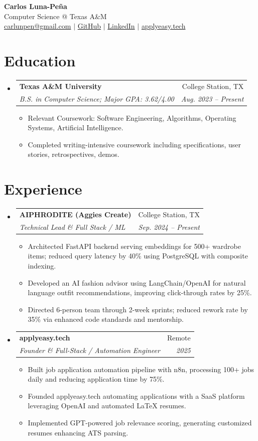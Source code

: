 \documentclass[letterpaper,11pt]{article}
\makeatletter
\newcommand{\resumeItem}[1]{\item\small{{#1 \vspace{-2pt}}}}
\newcommand{\resumeSubheading}[4]{
  \vspace{-2pt}\item
    \begin{tabular*}{0.97\textwidth}[t]{l@{\extracolsep{\fill}}r}
      \textbf{#1} & #2 \\
      \textit{\small#3} & \textit{\small #4} \\
    \end{tabular*}\vspace{-7pt}
}
\newcommand{\resumeSubHeadingListStart}{\begin{itemize}[leftmargin=0.15in, label={}]}
\newcommand{\resumeSubHeadingListEnd}{\end{itemize}}
\newcommand{\resumeItemListStart}{\begin{itemize}}
\newcommand{\resumeItemListEnd}{\end{itemize}\vspace{-5pt}}
\makeatother
\begin{document}
\begin{center}
    \textbf{\LARGE Carlos Luna-Peña}\\
    \small Computer Science @ Texas A\&M\\
    \href{mailto:carlunpen@gmail.com}{carlunpen@gmail.com} $|$ \href{https://github.com/clmoon2}{GitHub} $|$ \href{https://linkedin.com/in/carlos-luna}{LinkedIn} $|$ \href{https://applyeasy.tech}{applyeasy.tech}\\
\end{center}

\section{Education}
\resumeSubHeadingListStart
\resumeSubheading
{Texas A\&M University}{College Station, TX}
{B.S. in Computer Science; Major GPA: 3.62/4.00}{Aug. 2023 -- Present}
\resumeItemListStart
\resumeItem{Relevant Coursework: Software Engineering, Algorithms, Operating Systems, Artificial Intelligence.}
\resumeItem{Completed writing-intensive coursework including specifications, user stories, retrospectives, demos.}
\resumeItemListEnd
\resumeSubHeadingListEnd

\section{Experience}
\resumeSubHeadingListStart

\resumeSubheading
{AIPHRODITE (Aggies Create)}{College Station, TX}
{Technical Lead \& Full Stack / ML}{Sep. 2024 -- Present}
\resumeItemListStart
\resumeItem{Architected FastAPI backend serving embeddings for 500+ wardrobe items; reduced query latency by 40\% using PostgreSQL with composite indexing.}
\resumeItem{Developed an AI fashion advisor using LangChain/OpenAI for natural language outfit recommendations, improving click-through rates by 25\%.}
\resumeItem{Directed 6-person team through 2-week sprints; reduced rework rate by 35\% via enhanced code standards and mentorship.}
\resumeItemListEnd

\resumeSubheading
{applyeasy.tech}{Remote}
{Founder \& Full-Stack / Automation Engineer}{2025}
\resumeItemListStart
\resumeItem{Built job application automation pipeline with n8n, processing 100+ jobs daily and reducing application time by 75\%.}
\resumeItem{Founded applyeasy.tech automating applications with a SaaS platform leveraging OpenAI and automated LaTeX resumes.}
\resumeItem{Implemented GPT-powered job relevance scoring, generating customized resumes enhancing ATS parsing.}
\resumeItemListEnd
\resumeSubHeadingListEnd
\end{document}
